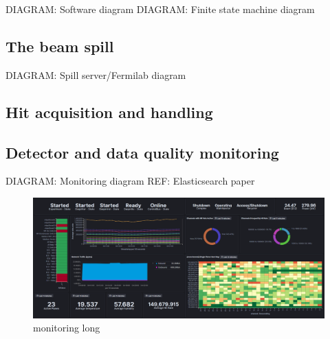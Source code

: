DIAGRAM: Software diagram
DIAGRAM: Finite state machine diagram

\subsection{The beam spill} %
\label{sec:daq_soft_spill} %

DIAGRAM: Spill server/Fermilab diagram

\subsection{Hit acquisition and handling} %
\label{sec:daq_soft_hits} %

\subsection{Detector and data quality monitoring} %
\label{sec:daq_soft_monitor} %

DIAGRAM: Monitoring diagram
REF: Elasticsearch paper

\begin{figure} %
    \includegraphics[width=\textwidth]{diagrams/6-daq/monitoring.png}
    \caption[monitoring short]
    {monitoring long}
    \label{fig:monitoring}
\end{figure}